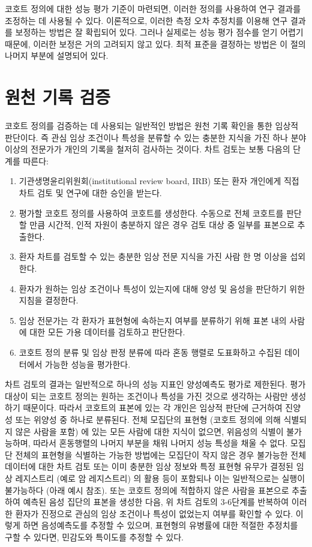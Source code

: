 \documentclass[10.5pt]{book}
\providecommand{\tightlist}{%
  \setlength{\itemsep}{0pt}\setlength{\parskip}{0pt}}
\theoremstyle{definition}
\theoremstyle{definition}
\theoremstyle{definition}
\theoremstyle{remark}
\begin{document}
코호트 정의에 대한 성능 평가 기준이 마련되면, 이러한 정의를 사용하여
연구 결과를 조정하는 데 사용될 수 있다. 이론적으로, 이러한 측정 오차
추정치를 이용해 연구 결과를 보정하는 방법은 잘 확립되어 있다. 그러나
실제로는 성능 평가 점수를 얻기 어렵기 때문에, 이러한 보정은 거의
고려되지 않고 있다. 최적 표준을 결정하는 방법은 이 절의 나머지 부분에
설명되어 있다.

\section{원천 기록 검증}\label{--}


코호트 정의를 검증하는 데 사용되는 일반적인 방법은 원천 기록 확인을 통한
임상적 판단이다. 즉 관심 임상 조건이나 특성을 분류할 수 있는 충분한
지식을 가진 하나 분야 이상의 전문가가 개인의 기록을 철저히 검사하는
것이다. 차트 검토는 보통 다음의 단계를 따른다:

\begin{enumerate}
\def\labelenumi{\arabic{enumi}.}
\tightlist
\item
  기관생명윤리위원회(institutional review board, IRB) 또는 환자 개인에게
  직접 차트 검토 및 연구에 대한 승인을 받는다.
\item
  평가할 코호트 정의를 사용하여 코호트를 생성한다. 수동으로 전체
  코호트를 판단할 만큼 시간적, 인적 자원이 충분하지 않은 경우 검토 대상
  중 일부를 표본으로 추출한다.
\item
  환자 차트를 검토할 수 있는 충분한 임상 전문 지식을 가진 사람 한 명
  이상을 섭외한다.
\item
  환자가 원하는 임상 조건이나 특성이 있는지에 대해 양성 및 음성을
  판단하기 위한 지침을 결정한다.
\item
  임상 전문가는 각 환자가 표현형에 속하는지 여부를 분류하기 위해 표본
  내의 사람에 대한 모든 가용 데이터를 검토하고 판단한다.
\item
  코호트 정의 분류 및 임상 판정 분류에 따라 혼동 행렬로 도표화하고
  수집된 데이터에서 가능한 성능을 평가한다.
\end{enumerate}

차트 검토의 결과는 일반적으로 하나의 성능 지표인 양성예측도 평가로
제한된다. 평가 대상이 되는 코호트 정의는 원하는 조건이나 특성을 가진
것으로 생각하는 사람만 생성하기 때문이다. 따라서 코호트의 표본에 있는 각
개인은 임상적 판단에 근거하여 진양성 또는 위양성 중 하나로 분류된다.
전체 모집단의 표현형 (코호트 정의에 의해 식별되지 않은 사람을 포함) 에
있는 모든 사람에 대한 지식이 없으면, 위음성의 식별이 불가능하며, 따라서
혼동행렬의 나머지 부분을 채워 나머지 성능 특성을 채울 수 없다. 모집단
전체의 표현형을 식별하는 가능한 방법에는 모집단이 작지 않은 경우
불가능한 전체 데이터에 대한 차트 검토 또는 이미 충분한 임상 정보와 특정
표현형 유무가 결정된 임상 레지스트리 (예로 암 레지스트리) 의 활용 등이
포함되나 이는 일반적으로는 실행이 불가능하다 (아래 예시 참조). 또는
코호트 정의에 적합하지 않은 사람을 표본으로 추출하여 예측된 음성 집단의
표본을 생성한 다음, 위 차트 검토의 3-6단계를 반복하여 이러한 환자가
진정으로 관심의 임상 조건이나 특성이 없었는지 여부를 확인할 수 있다.
이렇게 하면 음성예측도를 추정할 수 있으며, 표현형의 유병률에 대한 적절한
추정치를 구할 수 있다면, 민감도와 특이도를 추정할 수 있다.
\end{document}
